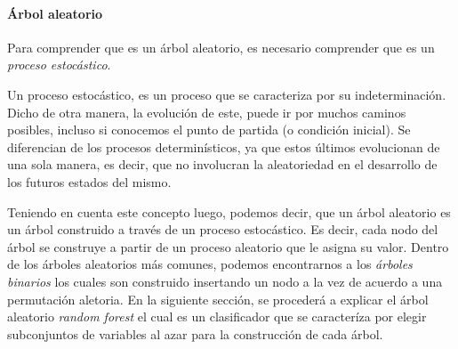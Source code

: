 \paragraph{Árbol aleatorio}
	
	Para comprender que es un árbol aleatorio, es necesario comprender que es un \textit{proceso estocástico}.
	
	Un proceso estocástico, es un proceso que se caracteriza por su indeterminación. Dicho de otra manera, la evolución de este, puede ir por muchos caminos posibles, incluso si conocemos el punto de partida (o condición inicial). Se diferencian de los procesos determinísticos, ya que estos últimos evolucionan de una sola manera, es decir, que no involucran la aleatoriedad en el desarrollo de los futuros estados del mismo.	
	
	Teniendo en cuenta este concepto luego, podemos decir, que un árbol aleatorio es un árbol construido a través de un proceso estocástico. Es decir, cada nodo del árbol se construye a partir de un proceso aleatorio que le asigna su valor. Dentro de los árboles aleatorios más comunes, podemos encontrarnos a  los \textit{árboles binarios} los cuales son construido insertando un nodo a la vez de acuerdo a una permutación aletoria. En la siguiente sección, se procederá a explicar el árbol aleatorio \textit{random forest} el cual es un clasificador que se caracteríza por elegir subconjuntos de variables al azar para la construcción de cada árbol.